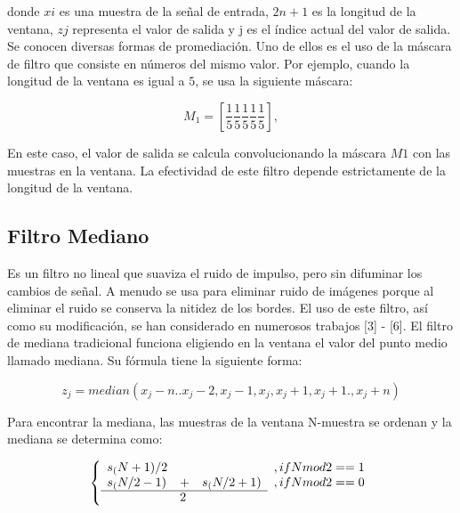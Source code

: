 \documentclass[10pt,a4paper]{article}
\begin{document}
\begin{multicols}{2}
\begin{itemize}
donde $xi$ es una muestra de la señal de entrada, $2n + 1$ es la longitud de la ventana, $zj$ representa el valor de salida y j es el índice actual del valor de salida. Se conocen diversas formas de promediación. Uno de ellos es el uso de la máscara de filtro que consiste en números del mismo valor. Por ejemplo, cuando la longitud de la ventana es igual a $5$, se usa la siguiente máscara:

\begin{equation}
M_{1}=\left[ \frac15\frac15\frac15\frac15\frac15 \right],
\end{equation}

En este caso, el valor de salida se calcula convolucionando la máscara $M1$ con las muestras en la ventana. La efectividad de este filtro depende estrictamente de la longitud de la ventana.


\subsection{Filtro Mediano}
Es un filtro no lineal que suaviza el ruido de impulso, pero sin difuminar los cambios de señal. A menudo se usa para eliminar ruido de imágenes porque al eliminar el ruido se conserva la nitidez de los bordes. El uso de este filtro, así como su modificación, se han considerado en numerosos trabajos [3] - [6]. El filtro de mediana tradicional funciona eligiendo en la ventana el valor del punto medio llamado mediana. Su fórmula tiene la siguiente forma:

\begin{equation}
z_{j}=median(x_{j}-n..x_{j}-2,x_{j}-1,x_{j},x_{j}+1,x_{j}+1.,x_{j}+n)
\end{equation}

Para encontrar la mediana, las muestras de la ventana N-muestra se ordenan y la mediana se determina como:


\begin{equation}
\left\lbrace
\begin{array}{llllll}
 s_(N+1)/2 &&&, if N mod 2==1 \\
 s_(N/2-1)&+&s_(N/2+1) & ,if N mod 2==0\\
\cline{1-3}
& 2
\end{array}
\right.
\end{equation}




\end{itemize}
\end{multicols}
\end{document}
